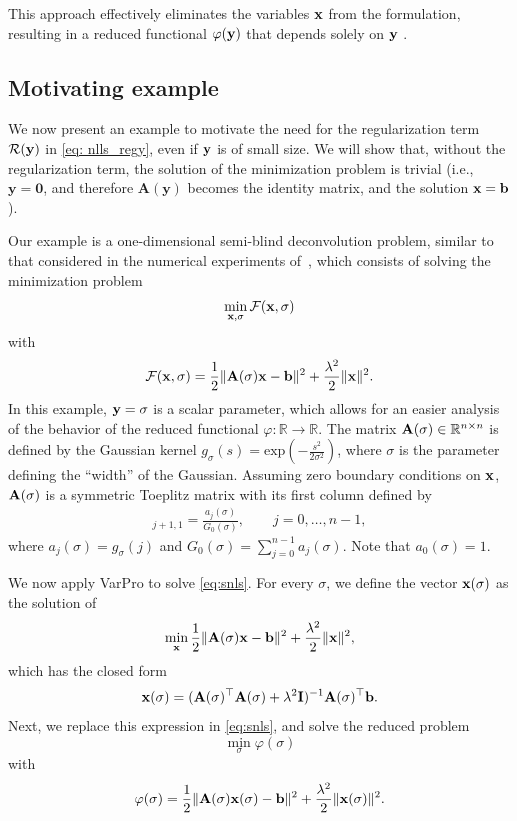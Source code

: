 \documentclass[onefignum,onetabnum]{siamart171218}
\newcommand{\bA}{{\bf A}}
\newcommand{\bI}{{\bf I}}
\newcommand{\bb}{{\bf b}}
\newcommand{\bx}{{\bf x}}
\newcommand{\by}{{\bf y}}
\newcommand{\calF}{\mathcal{F}}
\begin{document}
This approach effectively eliminates the variables $\bx$ from the formulation, resulting in a reduced functional $\varphi(\by)$ that depends solely on $\by$%
.

\subsection{Motivating example}\label{sec: motivating example}
We %
now present an example to motivate the need for the regularization term $\mathcal{R}(\by)$ in \eqref{eq: nlls_regy}, even if $\by$ is of small size. We will show that, without the regularization term, the solution of the minimization problem is trivial (i.e., $\mathbf{y}=\boldsymbol{0}$, and therefore $\mathbf{A}(\mathbf{y})$ becomes the identity matrix, and the solution $\bx=\bb$). 

Our example is a one-dimensional semi-blind deconvolution problem, similar to that considered in the numerical experiments of~\cite{Espanol_2023}, which consists of solving the minimization problem
\begin{equation}\label{eq:snls}
\min_{\bx, \sigma}  \calF(\bx,\sigma) 
\end{equation}
with $$\calF(\bx,\sigma) = \frac{1}{2}\| \bA(\sigma)\bx - \bb \|^2 + \frac{\lambda^2}{2} \|\bx\|^2.$$
In this example, $\by = \sigma$ is a scalar parameter, which allows for an easier analysis of the behavior of the reduced functional $\varphi\colon \mathbb{R} \to \mathbb{R}$. The matrix $\bA(\sigma)\in \mathbb{R}^{n\times n}$ is defined by the Gaussian kernel
$g_\sigma(s) = \mbox{exp}\left(-\frac{s^2}{2\sigma^2}\right)$, where $\sigma$ is the parameter defining the ``width'' of the Gaussian. Assuming zero boundary conditions on $\bx$, $\bA(\sigma)$ is a symmetric Toeplitz matrix with its first column defined by
\begin{align}
   [\bA(\sigma)]_{j+1,1}= \frac{a_j(\sigma)}{G_0(\sigma)}  , \qquad j=0, \dots, n-1,\nonumber
\end{align}
where $a_j(\sigma)=g_\sigma(j)$ and  $G_0(\sigma) = \sum_{j=0}^{n-1} a_j(\sigma)$. Note that $a_0(\sigma)=1$.

We now apply VarPro to solve \eqref{eq:snls}. For every $\sigma$, we define the vector $\bx(\sigma)$ as the solution of
\[ \min_{\bx} \frac{1}{2}\|\bA(\sigma) \bx - \bb \|^2 + \frac{\lambda^2}{2}\| \bx\|^2,\]
which has the closed form
\[\bx(\sigma) = (\bA(\sigma)^\top \bA(\sigma) + \lambda^2 \bI)^{-1} \bA(\sigma)^\top \bb.\]
Next, we  replace this expression  in \eqref{eq:snls}, and solve the reduced problem
\begin{equation*}
\min_\sigma  \varphi(\sigma) 
\end{equation*}
with 
\begin{equation}\label{eq: Tik-problem}
\varphi(\sigma) = \frac{1}{2}\|\bA(\sigma) \bx(\sigma) - \bb\|^2 + \frac{\lambda^2}{2} \| \bx(\sigma)\|^2.
\end{equation}
\end{document}

